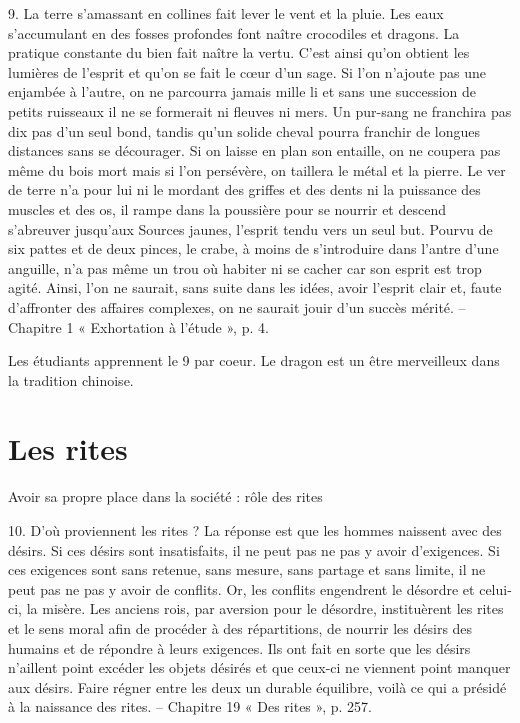 \begin{singlequote}
    9.	La terre s’amassant en collines fait lever le vent et la pluie. Les eaux s’accumulant en des fosses profondes font naître crocodiles et dragons. La pratique constante du bien fait naître la vertu. C’est ainsi qu’on obtient les lumières de l’esprit et qu’on se fait le cœur d’un sage. Si l’on n’ajoute pas une enjambée à l’autre, on ne parcourra jamais mille li et sans une succession de petits ruisseaux il ne se formerait ni fleuves ni mers. Un pur-sang ne franchira pas dix pas d’un seul bond, tandis qu’un solide cheval pourra franchir de longues distances sans se décourager. Si on laisse en plan son entaille, on ne coupera pas même du bois mort mais si l’on persévère, on taillera le métal et la pierre. Le ver de terre n’a pour lui ni le mordant des griffes et des dents ni la puissance des muscles et des os, il rampe dans la poussière pour se nourrir et descend s’abreuver jusqu’aux Sources jaunes, l’esprit tendu vers un seul but. Pourvu de six pattes et de deux pinces, le crabe, à moins de s’introduire dans l’antre d’une anguille, n’a pas même un trou où habiter ni se cacher car son esprit est trop agité. Ainsi, l’on ne saurait, sans suite dans les idées, avoir l’esprit clair et, faute d’affronter des affaires complexes, on ne saurait jouir d’un succès mérité.
-- Chapitre 1 « Exhortation à l’étude », p. 4.
\end{singlequote}
Les étudiants apprennent le 9 par coeur. 
Le dragon est un être merveilleux dans la tradition chinoise.



\section{Les rites
}

Avoir sa propre place dans la société : rôle des rites


\begin{singlequote}
    10.	D’où proviennent les rites ? La réponse est que les hommes naissent avec des désirs. Si ces désirs sont insatisfaits, il ne peut pas ne pas y avoir d’exigences. Si ces exigences sont sans retenue, sans mesure, sans partage et sans limite, il ne peut pas ne pas y avoir de conflits. Or, les conflits engendrent le désordre et celui-ci, la misère. Les anciens rois, par aversion pour le désordre, instituèrent les rites et le sens moral afin de procéder à des répartitions, de nourrir les désirs des humains et de répondre à leurs exigences. Ils ont fait en sorte que les désirs n’aillent point excéder les objets désirés et que ceux-ci ne viennent point manquer aux désirs. Faire régner entre les deux un durable équilibre, voilà ce qui a présidé à la naissance des rites.
-- Chapitre 19 « Des rites », p. 257.
\end{singlequote}


